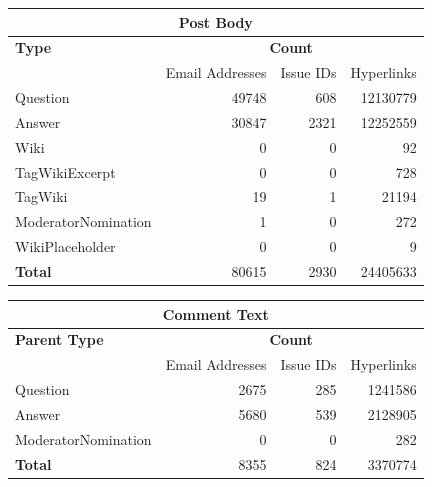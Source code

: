 \documentclass{article}
\begin{document}
\begin{tabular}[t]{| l | r | r | r |}
\hline
\multicolumn{4}{|c|}{Post Body} \\ \hline
\bf{Type} & \multicolumn{3}{|c|}{\bf{Count}} \\ \hline
 & Email Addresses & Issue IDs & Hyperlinks \\ \hline
Question & 49748 & 608 & 12130779 \\ \hline
Answer & 30847 & 2321 & 12252559 \\ \hline
Wiki &  0 & 0 & 92\\ \hline
TagWikiExcerpt & 0 & 0 & 728\\ \hline
TagWiki & 19 & 1 & 21194\\ \hline
ModeratorNomination & 1 & 0 & 272 \\ \hline
WikiPlaceholder & 0 & 0 & 9\\ \hline
\bf{Total}& 80615 & 2930 & 24405633 \\ \hline      
\end{tabular}

\vspace{\baselineskip}

\begin{tabular}[t]{| l | r | r | r |}
\hline
\multicolumn{4}{|c|}{Comment Text} \\ \hline
\bf{Parent Type} & \multicolumn{3}{|c|}{\bf{Count}} \\ \hline
 & Email Addresses & Issue IDs & Hyperlinks \\ \hline
Question & 2675 & 285 & 1241586 \\ \hline
Answer &  5680 & 539 & 2128905 \\ \hline
ModeratorNomination & 0 & 0 & 282 \\ \hline
\bf{Total}& 8355 & 824 & 3370774 \\ \hline      
\end{tabular}

{}

\end{document}
